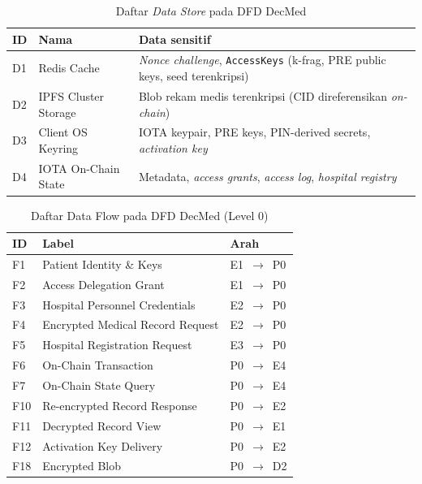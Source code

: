 \documentclass[bahasa, 12pt, a4paper, onecolumn, oneside, final]{report}
\begin{document}
\begin{table}[!ht]
	\centering
	\caption{Daftar \textit{Data Store} pada DFD DecMed}
	\label{tab:dfd-data-store}
	\small
	\begin{tabular}{|p{}|p{}|p{}|}
		\hline
		\textbf{ID} & \textbf{Nama}        & \textbf{Data sensitif}                                                                    \\ \hline
		D1          & Redis Cache          & \textit{Nonce challenge}, \texttt{AccessKeys} (k-frag, PRE public keys, seed terenkripsi) \\ \hline
		D2          & IPFS Cluster Storage & Blob rekam medis terenkripsi (CID direferensikan \textit{on-chain})                       \\ \hline
		D3          & Client OS Keyring    & IOTA keypair, PRE keys, PIN-derived secrets, \textit{activation key}                      \\ \hline
		D4          & IOTA On-Chain State  & Metadata, \textit{access grants}, \textit{access log}, \textit{hospital registry}         \\ \hline
	\end{tabular}
\end{table}

\begin{table}[!ht]
	\centering
	\caption{Daftar Data Flow pada DFD DecMed (Level 0)}
	\label{tab:dfd-dataflow-level-0}
	\small
	\begin{tabular}{|p{}|p{}|p{}|}
		\hline
		\textbf{ID} & \textbf{Label}                   & \textbf{Arah}       \\ \hline
		F1          & Patient Identity \& Keys         & E1~$\rightarrow$~P0 \\ \hline
		F2          & Access Delegation Grant          & E1~$\rightarrow$~P0 \\ \hline
		F3          & Hospital Personnel Credentials   & E2~$\rightarrow$~P0 \\ \hline
		F4          & Encrypted Medical Record Request & E2~$\rightarrow$~P0 \\ \hline
		F5          & Hospital Registration Request    & E3~$\rightarrow$~P0 \\ \hline
		F6          & On-Chain Transaction             & P0~$\rightarrow$~E4 \\ \hline
		F7          & On-Chain State Query             & P0~$\rightarrow$~E4 \\ \hline
		F10         & Re-encrypted Record Response     & P0~$\rightarrow$~E2 \\ \hline
		F11         & Decrypted Record View            & P0~$\rightarrow$~E1 \\ \hline
		F12         & Activation Key Delivery          & P0~$\rightarrow$~E2 \\ \hline
		F18         & Encrypted Blob                   & P0~$\rightarrow$~D2 \\ \hline
	\end{tabular}
\end{table}
\end{document}
